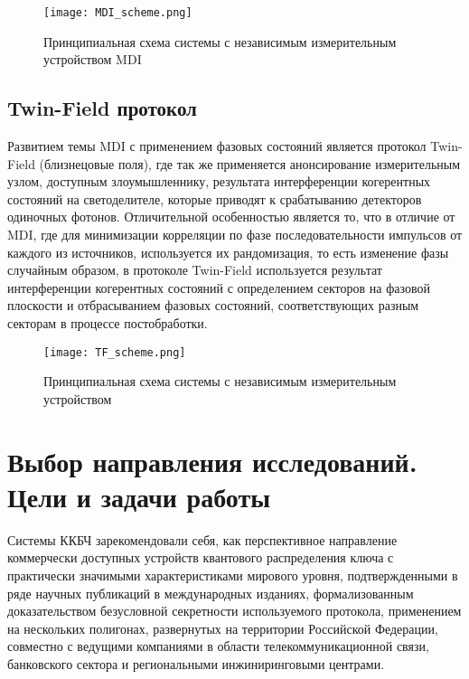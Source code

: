  \begin{figure}[ht]
  \centering
  \texttt{[image: MDI\_scheme.png]}
  \caption{Принципиальная схема системы с независимым измерительным устройством MDI}
  \label{fig:MDI_scheme}
\end{figure}


\subsection{Twin-Field протокол} \label{subsec:ch1/sec7/sub4}


Развитием темы MDI с применением фазовых состояний является протокол Twin-Field (близнецовые поля), где так же применяется анонсирование измерительным узлом, доступным злоумышленнику, результата интерференции когерентных состояний на светоделителе, которые приводят к срабатыванию детекторов одиночных фотонов. Отличительной особенностью является то, что в отличие от MDI, где для минимизации корреляции по фазе последовательности импульсов от каждого из источников, используется их рандомизация, то есть изменение фазы случайным образом, в протоколе Twin-Field используется результат интерференции когерентных состояний с определением секторов на фазовой плоскости и отбрасыванием фазовых состояний, соответствующих разным секторам в процессе постобработки.

 
 \begin{figure}[ht]
  \centering
  \texttt{[image: TF\_scheme.png]}
  \caption{Принципиальная схема системы с независимым измерительным устройством}
  \label{fig:TF_scheme}
\end{figure}

\section{Выбор направления исследований. Цели и задачи работы} \label{sec:ch1/sec8}

Системы ККБЧ зарекомендовали себя, как перспективное направление коммерчески доступных устройств квантового распределения ключа с практически значимыми характеристиками мирового уровня, подтвержденными в ряде научных публикаций в международных изданиях, формализованным доказательством безусловной секретности используемого протокола, применением на нескольких полигонах, развернутых на территории Российской Федерации, совместно с ведущими компаниями в области телекоммуникационной связи, банковского сектора и региональными инжиниринговыми центрами. 


